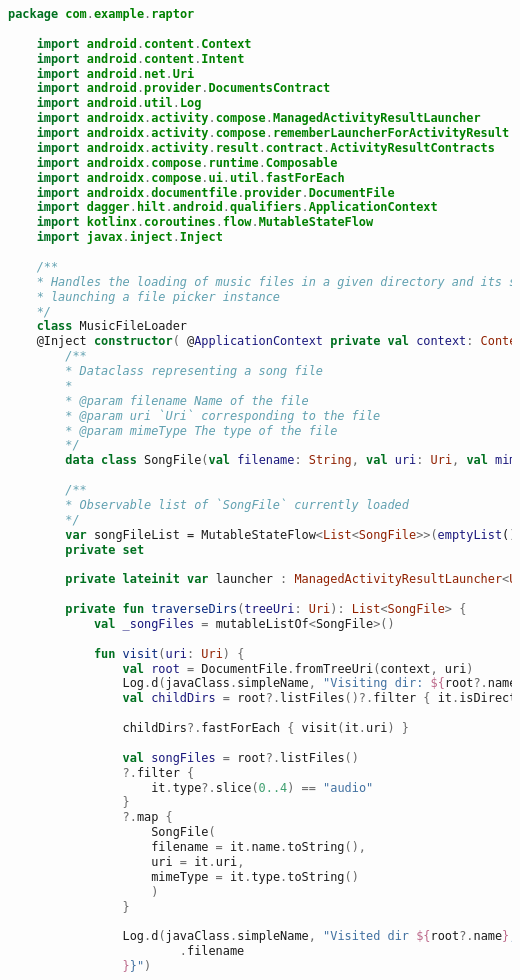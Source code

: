 \begin{lstlisting}[caption=Kod \texttt{MusicFileLoader}, label={lst:mfl-fullcode}, language=kotlin]
	package com.example.raptor
	
	import android.content.Context
	import android.content.Intent
	import android.net.Uri
	import android.provider.DocumentsContract
	import android.util.Log
	import androidx.activity.compose.ManagedActivityResultLauncher
	import androidx.activity.compose.rememberLauncherForActivityResult
	import androidx.activity.result.contract.ActivityResultContracts
	import androidx.compose.runtime.Composable
	import androidx.compose.ui.util.fastForEach
	import androidx.documentfile.provider.DocumentFile
	import dagger.hilt.android.qualifiers.ApplicationContext
	import kotlinx.coroutines.flow.MutableStateFlow
	import javax.inject.Inject
	
	/**
	* Handles the loading of music files in a given directory and its subdirectories as well as
	* launching a file picker instance
	*/
	class MusicFileLoader
	@Inject constructor( @ApplicationContext private val context: Context) {
		/**
		* Dataclass representing a song file
		*
		* @param filename Name of the file
		* @param uri `Uri` corresponding to the file
		* @param mimeType The type of the file
		*/
		data class SongFile(val filename: String, val uri: Uri, val mimeType: String)
		
		/**
		* Observable list of `SongFile` currently loaded
		*/
		var songFileList = MutableStateFlow<List<SongFile>>(emptyList())
		private set
		
		private lateinit var launcher : ManagedActivityResultLauncher<Uri?, Uri?>
		
		private fun traverseDirs(treeUri: Uri): List<SongFile> {
			val _songFiles = mutableListOf<SongFile>()
			
			fun visit(uri: Uri) {
				val root = DocumentFile.fromTreeUri(context, uri)
				Log.d(javaClass.simpleName, "Visiting dir: ${root?.name}")
				val childDirs = root?.listFiles()?.filter { it.isDirectory }
				
				childDirs?.fastForEach { visit(it.uri) }
				
				val songFiles = root?.listFiles()
				?.filter {
					it.type?.slice(0..4) == "audio"
				}
				?.map {
					SongFile(
					filename = it.name.toString(),
					uri = it.uri,
					mimeType = it.type.toString()
					)
				}
				
				Log.d(javaClass.simpleName, "Visited dir ${root?.name}, songs: ${songFiles?.map { it
						.filename 
				}}")
				

\end{lstlisting}
